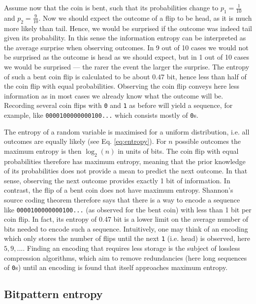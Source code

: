 Assume now that the coin is bent, such that its probabilities change to $p_1 = \tfrac{1}{10}$ and $p_2 = \tfrac{9}{10}$. Now we should expect the outcome
of a flip to be head, as it is much more likely than tail. Hence, we would be surprised if the outcome was indeed tail given its probability. In this sense
the information entropy can be interpreted as the average surprise when observing outcomes. In 9 out of 10 cases we would not be surprised as the
outcome is head as we should expect, but in 1 out of 10 cases we would be surprised --- the rarer the event the larger the surprise. The entropy of such
a bent coin flip is calculated to be about $0.47$ bit, hence less than half of the coin flip with equal probabilities. Observing the coin flip conveys here
less information as in most cases we already know what the outcome will be. Recording several coin flips with \texttt{0} and \texttt{1} as before
will yield a sequence, for example, like \texttt{0000100000000100...} which consists mostly of \texttt{0}s.

The entropy of a random variable is maximised for a uniform distribution, i.e. all outcomes are equally likely (see Eq. \ref{eq:entropy}). For $n$
possible outcomes the maximum entropy is then $\log_2(n)$ in units of bits. The coin flip with equal probabilities therefore has maximum
entropy, meaning that the prior knowledge of its probabilities does not provide a mean to predict the next outcome. In that sense, observing
the next outcome provides exactly 1 bit of information. In contrast, the flip of a bent coin does not have maximum entropy. Shannon's source
coding theorem \citep{Shannon1948} therefore says that there is a way to encode a sequence like \texttt{0000100000000100...} (as
observed for the bent coin) with less than 1 bit per coin flip. In fact, its entropy of 0.47 bit is a lower limit on the average number of bits needed
to encode such a sequence. Intuitively, one may think of an encoding which only stores the number of flips until the next \texttt{1} (i.e. head)
is observed, here $5,9,...$. Finding an encoding that requires less storage is the subject of lossless compression algorithms, which
aim to remove redundancies (here long sequences of \texttt{0}s) until an encoding is found that itself approaches maximum entropy.

\subsection{Bitpattern entropy}
\label{sec:bitpattern_entropy}

